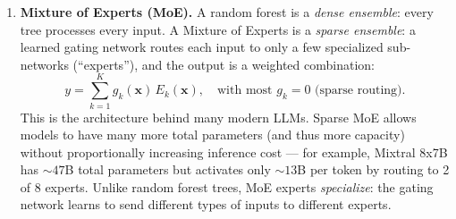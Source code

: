 \documentclass[submit]{harvardml}
\begin{document}
\begin{problem}
\begin{enumerate}
\begin{enumerate}
    \item \textbf{[8 points]} Prove that the variance of the ensemble prediction is:
    \[
    \text{Var}\!\left(\frac{1}{B}\sum_{b=1}^{B} T_b(\mathbf{x})\right) = \rho\,\sigma^2 + \frac{1-\rho}{B}\,\sigma^2.
    \]
    \emph{Hint:} Expand the variance of the sum, separate the diagonal terms ($i = j$) from the off-diagonal terms ($i \neq j$), and use $\text{Cov}(T_i, T_j) = \rho\,\sigma^2$.

    \item \textbf{[4 points]} Analyze the formula:
    \begin{enumerate}
        \item What does the ensemble variance converge to as $B \to \infty$? Can we make the variance arbitrarily small by adding more trees?
        \item What happens when $\rho = 0$? When $\rho = 1$? Relate each case to a practical scenario.
    \end{enumerate}

    \item \textbf{[4 points]} Random forests use $m = \lfloor\sqrt{d}\rfloor$ features per split (for classification). Using the formula from (d), explain why $m = 1$ (one random feature per split) is generally a bad idea, even though it minimizes $\rho$. What tradeoff does $m$ control?
\end{enumerate}

\item %
\medskip
\noindent
\textbf{Mixture of Experts (MoE).}\quad
A random forest is a \emph{dense ensemble}: every tree processes every input. A Mixture of Experts is a \emph{sparse ensemble}: a learned gating network routes each input to only a few specialized sub-networks (``experts''), and the output is a weighted combination:
\[
y = \sum_{k=1}^{K} g_k(\mathbf{x})\, E_k(\mathbf{x}), \quad \text{with most } g_k = 0 \text{ (sparse routing)}.
\]
This is the architecture behind many modern LLMs. Sparse MoE allows models to have many more total parameters (and thus more capacity) without proportionally increasing inference cost --- for example, Mixtral 8x7B has ${\sim}47$B total parameters but activates only ${\sim}13$B per token by routing to 2 of 8 experts. Unlike random forest trees, MoE experts \emph{specialize}: the gating network learns to send different types of inputs to different experts.


\end{enumerate}
\end{problem}
\end{document}
